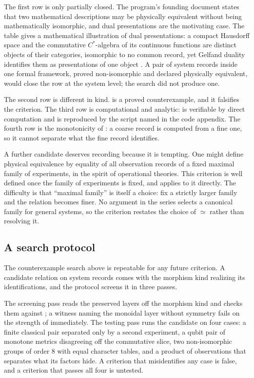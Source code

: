 \documentclass[11pt,letterpaper]{article}
\theoremstyle{definition}
\theoremstyle{remark}
\begin{document}
The first row is only partially closed. The program's founding document states that two mathematical descriptions may be physically equivalent without being mathematically isomorphic, and dual presentations are the motivating case. The table gives a mathematical illustration of dual presentations: a compact Hausdorff space and the commutative $C^*$-algebra of its continuous functions are distinct objects of their categories, isomorphic to no common record, yet Gelfand duality identifies them as presentations of one object \cite{b3}. A pair of system records inside one formal framework, proved non-isomorphic and declared physically equivalent, would close the row at the system level; the search did not produce one.

The second row is different in kind.  is a proved counterexample, and it falsifies the criterion. The third row is computational and analytic:  is verifiable by direct computation and is reproduced by the script named in the code appendix. The fourth row is the monotonicity of : a coarse record is computed from a fine one, so it cannot separate what the fine record identifies.

A further candidate deserves recording because it is tempting. One might define physical equivalence by equality of all observation records of a fixed maximal family of experiments, in the spirit of operational theories. This criterion is well defined once the family of experiments is fixed, and  applies to it directly. The difficulty is that ``maximal family'' is itself a choice: fix a strictly larger family and the relation becomes finer. No argument in the series selects a canonical family for general systems, so the criterion restates the choice of $\simeq$ rather than resolving it.

\subsection{A search protocol}
\label{sec:protocol}

The counterexample search above is repeatable for any future criterion. A candidate relation on system records comes with the morphism kind realizing its identifications, and the protocol screens it in three passes.

The screening pass reads the preserved layers off the morphism kind and checks them against ; a witness naming the monoidal layer without symmetry fails on the strength of  immediately. The testing pass runs the candidate on four cases: a finite classical pair separated only by a second experiment, a qubit pair of monotone metrics disagreeing off the commutative slice, two non-isomorphic groups of order 8 with equal character tables, and a product of observations that separates what its factors hide. A criterion that misidentifies any case is false, and a criterion that passes all four is untested.
\end{document}
